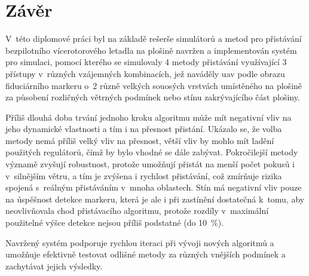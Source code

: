 \chapter{Závěr} \label{chap:conclusion}

V~této diplomové práci byl na základě rešerše simulátorů a metod pro přistávání bezpilotního vícerotorového letadla na plošině navržen a implementován systém pro simulaci, pomocí kterého se simulovaly 4 metody přistávání využívající 3 přístupy v~různých vzájemných kombinacích, jež naváděly \acrshort{uav} podle obrazu fiduciárního markeru o~2 různě velkých souosých vrstvách umístěného na plošině za působení rozličných větrných podmínek nebo stínu zakrývajícího část plošiny. 

Příliš dlouhá doba trvání jednoho kroku algoritmu může mít negativní vliv na jeho dynamické vlastnosti a tím i na přesnost přistání. Ukázalo se, že volba metody nemá příliš velký vliv na přesnost, větší vliv by mohlo mít ladění použitých regulátorů, čímž by bylo vhodné se dále zabývat. Pokročilejší metody významě zvyšují robustnost, protože umožňují přistát na menší počet pokusů i v~silnějším větru, a tím je zvýšena i rychlost přistávání, což zmírňuje rizika spojená s~reálným přistáváním v~mnoha oblastech. Stín má negativní
vliv pouze na úspěšnost detekce markeru, která je ale i při zastínění dostatečná k~tomu, aby neovlivňovala chod přistávacího algoritmu, protože rozdíly v~maximální použitelné výšce detekce nejsou příliš podstatné (do 10~\%).

Navržený systém podporuje rychlou iteraci při vývoji nových algoritmů a umožňuje efektivně testovat odlišné metody za různých vnějších podmínek a zachytávat jejich výsledky.